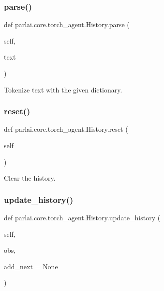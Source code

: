 \subsubsection{\texorpdfstring{parse()}{parse()}}
{\footnotesize\ttfamily def parlai.\+core.\+torch\+\_\+agent.\+History.\+parse (\begin{DoxyParamCaption}\item[{}]{self,  }\item[{}]{text }\end{DoxyParamCaption})}

\begin{DoxyVerb}Tokenize text with the given dictionary.
\end{DoxyVerb}
 \mbox{\label{classparlai_1_1core_1_1torch__agent_1_1History_a82e02d0b34707b2e00b95bc659411bae}} 
\subsubsection{\texorpdfstring{reset()}{reset()}}
{\footnotesize\ttfamily def parlai.\+core.\+torch\+\_\+agent.\+History.\+reset (\begin{DoxyParamCaption}\item[{}]{self }\end{DoxyParamCaption})}

\begin{DoxyVerb}Clear the history.
\end{DoxyVerb}
 \mbox{\label{classparlai_1_1core_1_1torch__agent_1_1History_ac7bdfbe78c9f6aed1118161bd24a7c8e}} 
\subsubsection{\texorpdfstring{update\+\_\+history()}{update\_history()}}
{\footnotesize\ttfamily def parlai.\+core.\+torch\+\_\+agent.\+History.\+update\+\_\+history (\begin{DoxyParamCaption}\item[{}]{self,  }\item[{}]{obs,  }\item[{}]{add\+\_\+next = {\ttfamily None} }\end{DoxyParamCaption})}

